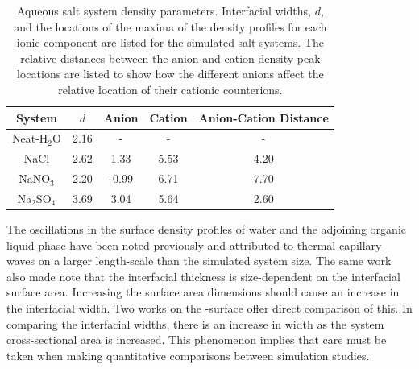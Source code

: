 \begin{table}[htdp]
	\begin{center}
	\begin{tabular}{|c||c|c|c|c|}
		\hline
		System & $d$ & Anion & Cation & Anion-Cation Distance \\ \hline
		Neat-H$_2$O & 2.16 & - & - & - \\ 
		NaCl & 2.62 & 1.33 & 5.53 & 4.20 \\
		NaNO$_3$ & 2.20 & -0.99 & 6.71 & 7.70 \\
		Na$_2$SO$_4$ & 3.69 & 3.04 & 5.64 & 2.60 \\
		\hline
	\end{tabular}
	\end{center}
	\caption{Aqueous salt system density parameters. Interfacial widths, $d$, and the locations of the maxima of the density profiles for each ionic component are listed for the simulated salt systems. The relative distances between the anion and cation density peak locations are listed to show how the different anions affect the relative location of their cationic counterions.}
	\label{system-params}
\end{table}

The oscillations in the surface density profiles of water and the adjoining organic liquid phase have been noted previously and attributed to thermal capillary waves on a larger length-scale than the simulated system size.\cite{Chang1996} The same work also made note that the interfacial thickness is size-dependent on the interfacial surface area. Increasing the surface area dimensions should cause an increase in the interfacial width. Two works on the \wat-\ctc surface offer direct comparison of this.\cite{Chang1996,Hore2008} In comparing the interfacial widths, there is an increase in width as the system cross-sectional area is increased. This phenomenon implies that care must be taken when making quantitative comparisons between simulation studies.

